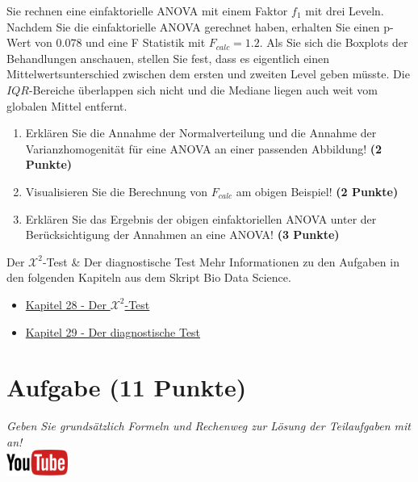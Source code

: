 \documentclass[a4paper, 10pt]{scrartcl}\usepackage[]{graphicx}\usepackage[]{xcolor}
\begin{document}
Sie rechnen eine einfaktorielle ANOVA mit einem Faktor $f_1$ mit
drei Leveln. Nachdem Sie die einfaktorielle ANOVA gerechnet
haben, erhalten Sie einen p-Wert von $0.078$ und eine F Statistik mit
$F_{calc} = 1.2$. Als Sie sich die Boxplots der Behandlungen anschauen,
stellen Sie fest, dass es eigentlich einen Mittelwertsunterschied zwischen
dem ersten und zweiten Level geben m{\"u}sste. Die
$IQR$-Bereiche {\"u}berlappen sich nicht und die Mediane liegen auch weit vom
globalen Mittel entfernt.


\begin{enumerate}
\item Erkl{\"a}ren Sie die Annahme der Normalverteilung und die Annahme der
  Varianzhomogenit{\"a}t f{\"u}r eine ANOVA an einer passenden Abbildung! \textbf{(2 Punkte)}
\item Visualisieren Sie die Berechnung von $F_{calc}$ am obigen Beispiel!
  \textbf{(2 Punkte)}
\item Erkl{\"a}ren Sie das Ergebnis der obigen einfaktoriellen ANOVA unter der
  Ber{\"u}cksichtigung der Annahmen an eine ANOVA! \textbf{(3 Punkte)}
\end{enumerate}

 
\clearpage
  \begin{graybox}{Der $\mathcal{X}^2$-Test \& Der diagnostische Test}
Mehr Informationen zu den Aufgaben in den folgenden Kapiteln aus dem Skript Bio Data Science.
  \begin{itemize}
  \item \href{https://jkruppa.github.io/stat-tests-chi-test.html}{Kapitel 28 - Der $\mathcal{X}^2$-Test}
  \item \href{https://jkruppa.github.io/stat-tests-diagnostic.html}{Kapitel 29 - Der diagnostische Test}
  \end{itemize}
\end{graybox}
\clearpage

\section{Aufgabe \hfill (11 Punkte)}

\textit{Geben Sie grunds{\"a}tzlich Formeln und Rechenweg zur L{\"o}sung der
  Teilaufgaben mit an!} \\[1Ex]

\hfill\href{https://youtu.be/-Kva5wc5Elw}{\includegraphics[width =
  2cm]{img/youtube}}\\[1Ex]
\end{document}
